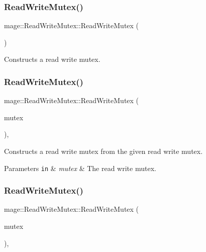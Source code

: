 \subsubsection{\texorpdfstring{Read\+Write\+Mutex()}{ReadWriteMutex()}\hspace{0.1cm}{\footnotesize\ttfamily [1/3]}}
{\footnotesize\ttfamily mage\+::\+Read\+Write\+Mutex\+::\+Read\+Write\+Mutex (\begin{DoxyParamCaption}{ }\end{DoxyParamCaption})\hspace{0.3cm}{\ttfamily [private]}}

Constructs a read write mutex. \hypertarget{classmage_1_1_read_write_mutex_aacb2f69e7e2b084147e1e45628e9dd67}{}\label{classmage_1_1_read_write_mutex_aacb2f69e7e2b084147e1e45628e9dd67} 
\subsubsection{\texorpdfstring{Read\+Write\+Mutex()}{ReadWriteMutex()}\hspace{0.1cm}{\footnotesize\ttfamily [2/3]}}
{\footnotesize\ttfamily mage\+::\+Read\+Write\+Mutex\+::\+Read\+Write\+Mutex (\begin{DoxyParamCaption}\item[{const \hyperlink{classmage_1_1_read_write_mutex}{Read\+Write\+Mutex} \&}]{mutex }\end{DoxyParamCaption})\hspace{0.3cm}{\ttfamily [private]}, {\ttfamily [delete]}}

Constructs a read write mutex from the given read write mutex.


\begin{DoxyParams}[1]{Parameters}
\mbox{\tt in}  & {\em mutex} & The read write mutex. \\
\hline
\end{DoxyParams}
\hypertarget{classmage_1_1_read_write_mutex_a664e946edfa742dad648fc9fcb29832e}{}\label{classmage_1_1_read_write_mutex_a664e946edfa742dad648fc9fcb29832e} 
\subsubsection{\texorpdfstring{Read\+Write\+Mutex()}{ReadWriteMutex()}\hspace{0.1cm}{\footnotesize\ttfamily [3/3]}}
{\footnotesize\ttfamily mage\+::\+Read\+Write\+Mutex\+::\+Read\+Write\+Mutex (\begin{DoxyParamCaption}\item[{\hyperlink{classmage_1_1_read_write_mutex}{Read\+Write\+Mutex} \&\&}]{mutex }\end{DoxyParamCaption})\hspace{0.3cm}{\ttfamily [private]}, {\ttfamily [delete]}}


